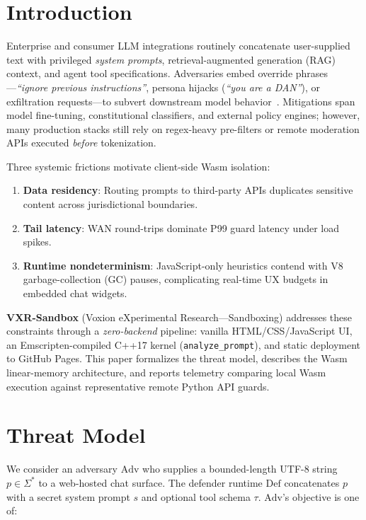 \documentclass[conference]{IEEEtran}
\begin{document}
\section{Introduction}
\label{sec:intro}

Enterprise and consumer LLM integrations routinely concatenate user-supplied text with privileged \emph{system prompts}, retrieval-augmented generation (RAG) context, and agent tool specifications. Adversaries embed override phrases---\emph{``ignore previous instructions''}, persona hijacks (\emph{``you are a DAN''}), or exfiltration requests---to subvert downstream model behavior~\cite{liu2024prompt,perez2022ignore}. Mitigations span model fine-tuning, constitutional classifiers, and external policy engines; however, many production stacks still rely on regex-heavy pre-filters or remote moderation APIs executed \emph{before} tokenization.

Three systemic frictions motivate client-side Wasm isolation:

\begin{enumerate}
    \item \textbf{Data residency}: Routing prompts to third-party APIs duplicates sensitive content across jurisdictional boundaries.
    \item \textbf{Tail latency}: WAN round-trips dominate P99 guard latency under load spikes.
    \item \textbf{Runtime nondeterminism}: JavaScript-only heuristics contend with V8 garbage-collection (GC) pauses, complicating real-time UX budgets in embedded chat widgets.
\end{enumerate}

\textbf{VXR-Sandbox} (Voxion eXperimental Research---Sandboxing) addresses these constraints through a \emph{zero-backend} pipeline: vanilla HTML/CSS/JavaScript UI, an Emscripten-compiled C++17 kernel (\texttt{analyze\_prompt}), and static deployment to GitHub Pages. This paper formalizes the threat model, describes the Wasm linear-memory architecture, and reports telemetry comparing local Wasm execution against representative remote Python API guards.

\section{Threat Model}
\label{sec:threat}

We consider an adversary $\mathrm{Adv}$ who supplies a bounded-length UTF-8 string $p \in \Sigma^\ast$ to a web-hosted chat surface. The defender runtime $\mathrm{Def}$ concatenates $p$ with a secret system prompt $s$ and optional tool schema $\tau$. $\mathrm{Adv}$'s objective is one of:
\end{document}
